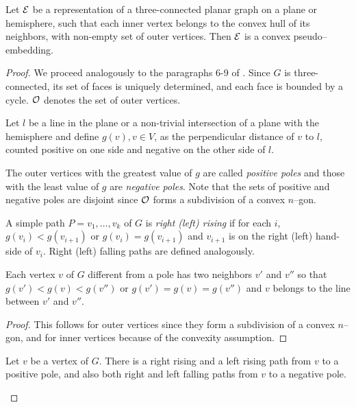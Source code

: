 \documentclass[invmat]{svjour}
\begin{document}
\begin{proposition}
\label{p:three_conn_embed}
Let $\mathcal{E}$ be a representation of a three-connected planar graph on a
plane or hemisphere, such that each inner vertex belongs to the
convex hull of its neighbors, with non-empty set of outer vertices. Then
$\mathcal{E}$ is a convex pseudo--embedding.
\end{proposition}

\begin{proof}
We proceed analogously to the paragraphs 6-9 of \cite{Tutte}. Since
$G$ is three-connected, its set of faces is uniquely determined, and each
face is bounded by a cycle. $\mathcal{O}$ denotes the set of outer vertices.

Let $l$ be a line in the plane or a non-trivial intersection of 
a plane with the hemisphere and define $g(v), v\in V$, 
as the perpendicular distance of $v$ to $l$, 
counted positive on one side and negative on the other side of $l$.

The outer vertices with the greatest value of $g$ are called {\em positive
poles} and those with the least value of $g$ are {\em negative poles}.
Note that the sets of positive and negative poles are disjoint since $\mathcal{O}$
forms a subdivision of a convex $n$--gon.

A simple path $P=v_1,\dots, v_k$ of $G$ is {\em right (left) rising} if
for each $i$, $g(v_i)< g(v_{i+1})$ or $g(v_i)= g(v_{i+1})$ and $v_{i+1}$
is on the right (left) hand-side of $v_i$.
Right (left) falling paths are defined analogously.

\begin{lemma}
\label{l:vertex_different}
Each vertex $v$ of $G$ different from a pole has two neighbors $v'$
and $v''$ so that $g(v')< g(v)< g(v'')$ or $g(v')=g(v)=g(v'')$ and $v$
belongs to the line between $v'$ and $v''$.
\end{lemma}

\begin{proof}
This follows for outer vertices since they form a subdivision of a convex
$n$--gon, and for inner vertices because of the convexity assumption.
\end{proof}

\begin{lemma}
\label{l:right_left_rising}
Let $v$ be a vertex of $G$. There is a right rising and a left
rising path from $v$ to a positive pole, and also both right and left
falling paths from $v$ to a negative pole.
\end{lemma}


\end{proof}
\end{document}
